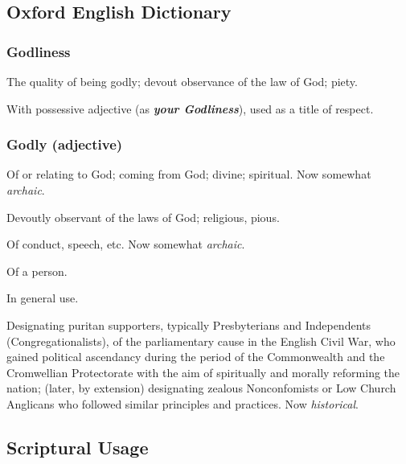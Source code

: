 \subsection{Oxford English Dictionary} %
	\label{GODLINESS-OED}
	
	\subsubsection{Godliness}

		\begin{compactitem}
			\item[1] The quality of being godly; devout observance of the law of God; piety.
			\item[2] With possessive adjective (as \textit{\textbf{your Godliness}}), used as a title of respect.
		\end{compactitem}
		
	\subsubsection{Godly (adjective)}

		\begin{compactitem}
			\item[1] Of or relating to God; coming from God; divine; spiritual. Now somewhat \textit{archaic}.
			\item[2] Devoutly observant of the laws of God; religious, pious.
			\item[2.a] Of conduct, speech, etc. Now somewhat \textit{archaic}.
			\item[2.b] Of a person.
			\item[2.b.(a)] In general use.
			\item[2.b.(b)] Designating puritan supporters, typically Presbyterians and Independents (Congregationalists), of the parliamentary cause in the English Civil War, who gained political ascendancy during the period of the Commonwealth and the Cromwellian Protectorate with the aim of spiritually and morally reforming the nation; (later, by extension) designating zealous Nonconfomists or Low Church Anglicans who followed similar principles and practices. Now \textit{historical}.
		\end{compactitem}

\subsection{Scriptural Usage} %
	\label{GODLINESS-SCRIPTURES}

